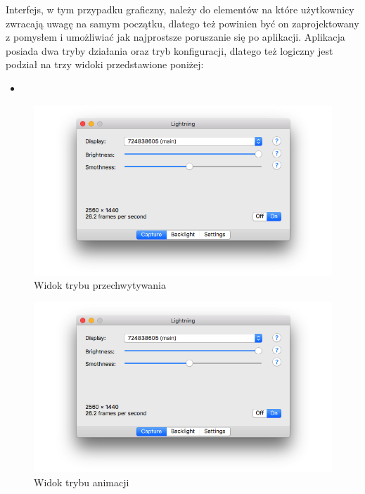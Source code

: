 \documentclass[12pt]{report}
\begin{document}
Interfejs, w tym przypadku graficzny, należy do elementów na które użytkownicy zwracają uwagę na samym początku, dlatego też powinien być on zaprojektowany z pomysłem i umożliwiać jak najprostsze poruszanie się po aplikacji.
Aplikacja posiada dwa tryby działania oraz tryb konfiguracji, dlatego też logiczny jest podział na trzy widoki przedstawione poniżej:


\begin{itemize}
	\item 
\end{itemize}

\begin{figure}[h]
\centering
\includegraphics[width=\textwidth]{../resources/capture.png}
\caption{Widok trybu przechwytywania}
\end{figure}

\begin{figure}[h]
\centering
\includegraphics[width=\textwidth]{../resources/capture.png}
\caption{Widok trybu animacji}
\end{figure}
\end{document}
